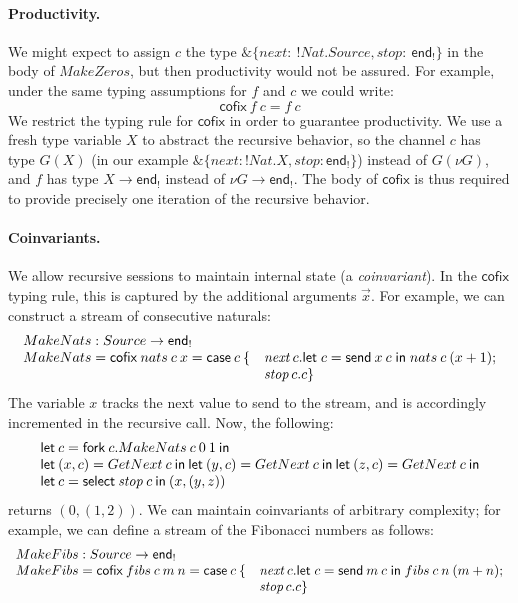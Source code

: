 \documentclass[orivec,envcountsame]{llncs}
\makeatletter
\newcommand{\with}{\mathbin\binampersand}
\newcommand{\gvout}[2]{{!#1.#2}}
\newcommand{\uto}{\ensuremath{\rightarrow}}
\newcommand{\outterm}{\mkwd{end}_!}
\newcommand{\mkwd}[1]{\mathsf{#1}}
\newcommand{\clabel}[1]{\mathit{#1}}
\newcommand{\gvsend}[2]{\mkwd{send}\:#1\:#2}
\newcommand{\gvlet}[3]{\mkwd{let}\;#1 = #2\;\mkwd{in}\;#3}
\newcommand{\gvselect}[2]{\mkwd{select}\:#1\:#2}
\newcommand{\gvfork}[2]{\mkwd{fork}\:#1.#2}
\newcommand{\lrkwd}{\mkwd{cofix}}
\newcommand{\gvfix}[3]{\lrkwd\:#1\:#2 = #3}
\newcommand{\key}{\mkwd}
\newcommand{\cofix}{\lrkwd}
\newcommand{\ba}{\begin{array}}
\newcommand{\ea}{\end{array}}
\newcommand{\bl}{\ba[t]{@{}l@{}}}
\newcommand{\el}{\ea}
\newcommand{\mcl}[2]{\multicolumn{#1}{l}{#2}}
\makeatother
\begin{document}
\paragraph{Productivity.}
We might expect to assign $c$ the type $\with \{\clabel{next}:\:\gvout{Nat}{Source}, \clabel{stop}:\:\outterm
\}$ in the body of $MakeZeros$, but then productivity would not be assured. For example, under the
same typing assumptions for $f$ and $c$ we could write:
\small\[
\cofix\:f\:c = f\:c
\]\normalsize
%
We restrict the typing rule for $\cofix$ in order to guarantee productivity. We use a fresh type
variable $X$ to abstract the recursive behavior, so the channel $c$ has type $G(X)$ (in our example
$\with \{\clabel{next}: \gvout{Nat}{X}, \clabel{stop}: \outterm \}$) instead of $G(\nu G)$, and $f$ has type
$X \uto \outterm$ instead of $\nu G \uto \outterm$. The body of $\cofix$ is thus required to provide
precisely one iteration of the recursive behavior.

\paragraph{Coinvariants.}

We allow recursive sessions to maintain internal state (a \emph{coinvariant}). In the $\cofix$
typing rule, this is captured by the additional arguments $\vec{x}$. For example, we can construct a
stream of consecutive naturals:
\small\[
\begin{array}{ll}
  \mcl{2}{MakeNats : Source \uto \outterm} \\
  MakeNats = \gvfix{nats}{c\:x}{\mkwd{case}\:c\:\{ &\clabel{next}\,c.\gvlet{c}{\gvsend{x}{c}}{nats\:c\:(x+1)}; \\
                                &\clabel{stop}\,c.c\}}
\end{array}
\]\normalsize
The variable $x$ tracks the next value to send to the stream, and is accordingly incremented in the
recursive call. Now, the following:
\small\[
\bl
\key{let}\:c = \gvfork{c}{MakeNats\:c\:0\:1}\:\key{in} \\
\key{let}\:(x, c) = GetNext\:c\:\key{in}\:
\key{let}\:(y, c) = GetNext\:c\:\key{in}\:
\key{let}\:(z, c) = GetNext\:c\:\key{in} \\
\key{let}\:c = \gvselect{\clabel{stop}}{c}\:\key{in}\:(x,(y,z)) \\
\el
\]\normalsize
returns $(0, (1, 2))$.
%
We can maintain coinvariants of arbitrary complexity; for example, we can define a
stream of the Fibonacci numbers as follows:
\small\[
\begin{array}{ll}
  \mcl{2}{MakeFibs : Source \uto \outterm} \\
  MakeFibs = \gvfix{fibs}{c\:m\:n}{\mkwd{case}\:c\:\{ &\clabel{next}\,c.\gvlet{c}{\gvsend{m}{c}}{fibs\:c\:n\:(m+n)}; \\
    &\clabel{stop}\,c.c\}}
\end{array}
\]\normalsize
\end{document}
